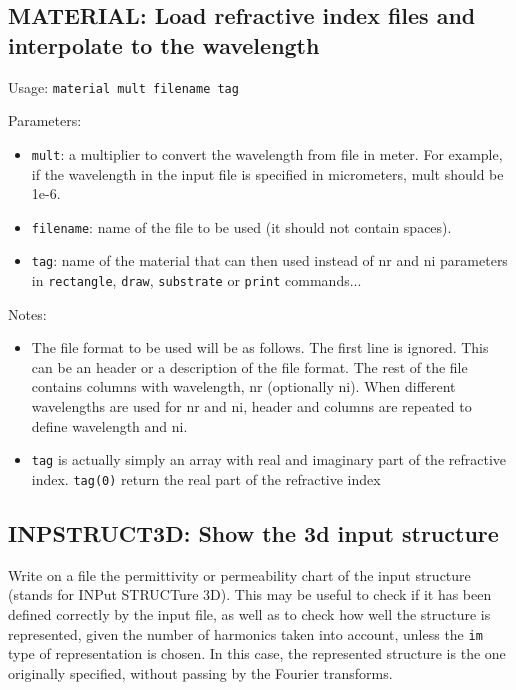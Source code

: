 \subsection{MATERIAL: Load refractive index files and interpolate to the wavelength}
\label{subsec_material}
Usage: \lstinline!material mult filename tag!

Parameters:
\begin{itemize}
\item \lstinline!mult!: a multiplier to convert the wavelength from file in meter.
For example, if the wavelength in the input file is specified in micrometers, mult 
should be 1e-6.
\item \lstinline!filename!: name of the file to be used (it should not contain spaces).
\item \lstinline!tag!: name of the material that can then used instead of nr and ni 
    	parameters in \lstinline!rectangle!, \lstinline!draw!, \lstinline!substrate!
    	or \lstinline!print! commands...
\end{itemize}

Notes:
\begin{itemize}
\item The file format to be used will be as follows. The first line is ignored.
This can be an header or a description of the file format.
    The rest of the file contains columns with wavelength, nr (optionally ni).
    When different wavelengths are used for nr and ni, header and columns are
    repeated to define wavelength and ni.
\item \lstinline!tag! is actually simply an array with real and imaginary part of
the refractive index. \lstinline!tag(0)! return the real part of the refractive
index
\end{itemize}


\subsection{INPSTRUCT3D: Show the 3d input structure}
\label{subsec_inpstruct3d}
Write on a file the permittivity or permeability chart of the input structure (stands for INPut STRUCTure 3D). This may be useful to check if it has been 
defined correctly by the input file, as well as to check how well the structure
is represented, given the number of harmonics taken into account, unless the \lstinline!im! type of representation is chosen. In this case, the represented structure is the one originally specified, without passing by the Fourier transforms.
    
